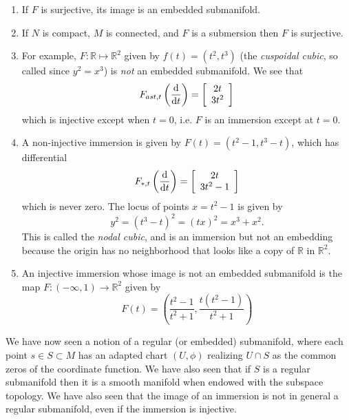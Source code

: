 \begin{enumerate}
  \item{
    If $F$ is surjective, its image is an embedded submanifold.
  }
  \item{
    If $N$ is compact, $M$ is connected, and $F$ is a submersion then
    $F$ is surjective.
  }
  \item{
    For example, $F: \mathbb{R} \mapsto \mathbb{R}^2$ given by
    $f(t) = (t^2, t^3)$ (the \emph{cuspoidal cubic}, so called since
    $y^2 = x^3$) is \emph{not} an embedded submanifold. We see that
    $$
      F_{ast, t}
        \left(
          \frac{\mathop{}\!\mathrm{d}}{\mathop{}\!\mathrm{d} t}
        \right)
    = \left[
        \begin{array}{c}
          2t \\ 3t^2
        \end{array}
      \right]
    $$
    which is injective except when $t = 0$, i.e. $F$ is an immersion
    except at $t = 0$.
  }
  \item{
    A non-injective immersion is given by
    $F(t) = (t^2 - 1, t^3 - t)$, which has differential
    $$
      F_{\ast, t}
        \left(
          \frac{\mathop{}\!\mathrm{d}}{\mathop{}\!\mathrm{d} t}
        \right)
    = \left[
        \begin{array}{c}
          2t \\ 3t^2 - 1
        \end{array}
      \right]
    $$
    which is never zero. The locus of points
    $x = t^2 - 1$ is given by
    $$
      y^2
    = (t^3 - t)^2
    = (tx)^2
    = x^3 + x^2.
    $$
    This is called the \emph{nodal cubic}, and is an immersion but not
    an embedding because the origin has no neighborhood that looks
    like a copy of $\mathbb{R}$ in $\mathbb{R}^2$.
  }
  \item{
    An injective immersion whose image is not an embedded submanifold
    is the map $F: (-\infty, 1) \to \mathbb{R}^2$ given by
    $$
      F(t)
    = \left(
        \frac{t^2 - 1}{t^2 + 1},
        \frac{t(t^2 - 1)}{t^2 + 1}
      \right)
    $$
  }
\end{enumerate}

We have now seen a notion of a regular (or embedded) submanifold,
where each point $s \in S \subset M$ has an adapted chart $(U, \phi)$
realizing $U \cap S$ as the common zeros of the coordinate
function. We have also seen that if $S$ is a regular submanifold then
it is a smooth manifold when endowed with the subspace topology. We
have also seen that the image of an immersion is not in general a
regular submanifold, even if the immersion is injective.

